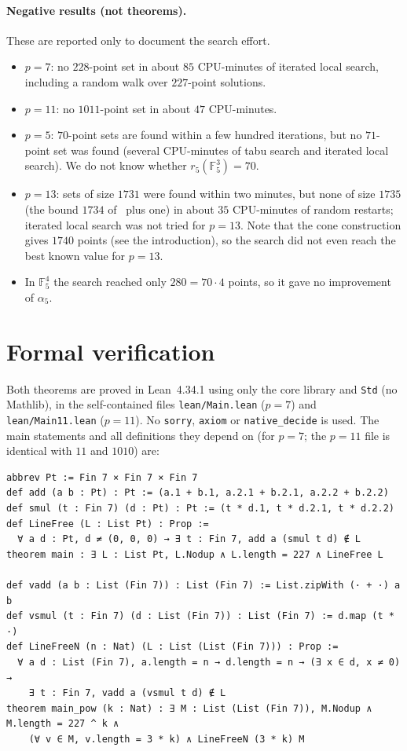 \documentclass[11pt]{article}
\numberwithin{equation}{section}
\theoremstyle{definition}
\theoremstyle{remark}
\newcommand{\F}{\mathbb F}
\begin{document}
\paragraph{Negative results (not theorems).}
These are reported only to document the search effort.
\begin{itemize}
\item $p=7$: no $228$-point set in about $85$ CPU-minutes of iterated local search, including a
random walk over $227$-point solutions.
\item $p=11$: no $1011$-point set in about $47$ CPU-minutes.
\item $p=5$: $70$-point sets are found within a few hundred iterations, but no $71$-point set was
found (several CPU-minutes of tabu search and iterated local search). We do not know whether
$r_5(\F_5^3)=70$.
\item $p=13$: sets of size $1731$ were found within two minutes, but none of size $1735$ (the
bound $1734$ of~\cite{EFFKPSV} plus one) in about $35$ CPU-minutes of random restarts; iterated
local search was not tried for $p=13$. Note that the cone construction gives $1740$ points
(see the introduction), so the search did not even reach the best known value for $p=13$.
\item In $\F_5^4$ the search reached only $280=70\cdot4$ points, so it gave no improvement of
$\alpha_5$.
\end{itemize}

\section{Formal verification}\label{sec:lean}

Both theorems are proved in Lean~4.34.1 using only the core library and \texttt{Std} (no
Mathlib), in the self-contained files \texttt{lean/Main.lean} ($p=7$) and
\texttt{lean/Main11.lean} ($p=11$). No \texttt{sorry}, \texttt{axiom} or \texttt{native\_decide}
is used. The main statements and all definitions they depend on (for $p=7$; the $p=11$ file is
identical with $11$ and $1010$) are:
\begin{lstlisting}
abbrev Pt := Fin 7 × Fin 7 × Fin 7
def add (a b : Pt) : Pt := (a.1 + b.1, a.2.1 + b.2.1, a.2.2 + b.2.2)
def smul (t : Fin 7) (d : Pt) : Pt := (t * d.1, t * d.2.1, t * d.2.2)
def LineFree (L : List Pt) : Prop :=
  ∀ a d : Pt, d ≠ (0, 0, 0) → ∃ t : Fin 7, add a (smul t d) ∉ L
theorem main : ∃ L : List Pt, L.Nodup ∧ L.length = 227 ∧ LineFree L

def vadd (a b : List (Fin 7)) : List (Fin 7) := List.zipWith (· + ·) a b
def vsmul (t : Fin 7) (d : List (Fin 7)) : List (Fin 7) := d.map (t * ·)
def LineFreeN (n : Nat) (L : List (List (Fin 7))) : Prop :=
  ∀ a d : List (Fin 7), a.length = n → d.length = n → (∃ x ∈ d, x ≠ 0) →
    ∃ t : Fin 7, vadd a (vsmul t d) ∉ L
theorem main_pow (k : Nat) : ∃ M : List (List (Fin 7)), M.Nodup ∧ M.length = 227 ^ k ∧
    (∀ v ∈ M, v.length = 3 * k) ∧ LineFreeN (3 * k) M
\end{lstlisting}
\end{document}
